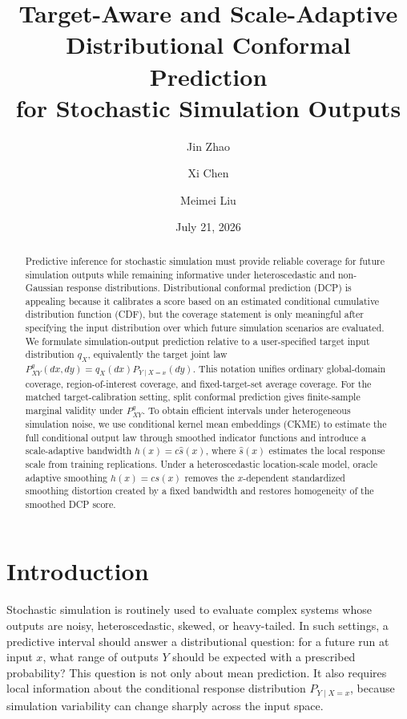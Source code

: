 \documentclass[11pt]{article}
\title{Target-Aware and Scale-Adaptive Distributional Conformal Prediction\\
for Stochastic Simulation Outputs}
\author{Jin Zhao \and Xi Chen \and Meimei Liu}
\date{July 21, 2026}
\newif\ifincludeexperiments
\begin{document}
\maketitle

\begin{abstract}
Predictive inference for stochastic simulation must provide reliable coverage for future simulation outputs while remaining informative under heteroscedastic and non-Gaussian response distributions. Distributional conformal prediction (DCP) is appealing because it calibrates a score based on an estimated conditional cumulative distribution function (CDF), but the coverage statement is only meaningful after specifying the input distribution over which future simulation scenarios are evaluated. We formulate simulation-output prediction relative to a user-specified target input distribution \(q_X\), equivalently the target joint law \(P^q_{XY}(dx,dy)=q_X(dx)P_{Y\mid X=x}(dy)\). This notation unifies ordinary global-domain coverage, region-of-interest coverage, and fixed-target-set average coverage. For the matched target-calibration setting, split conformal prediction gives finite-sample marginal validity under \(P^q_{XY}\). To obtain efficient intervals under heterogeneous simulation noise, we use conditional kernel mean embeddings (CKME) to estimate the full conditional output law through smoothed indicator functions and introduce a scale-adaptive bandwidth \(h(x)=c\widehat s(x)\), where \(\widehat s(x)\) estimates the local response scale from training replications. Under a heteroscedastic location-scale model, oracle adaptive smoothing \(h(x)=c s(x)\) removes the \(x\)-dependent standardized smoothing distortion created by a fixed bandwidth and restores homogeneity of the smoothed DCP score.
\ifincludeexperiments
Empirically, oracle adaptive smoothing improves worst-bin coverage deviation and paired interval score across Gaussian, queueing, and heavy-tailed benchmarks while preserving nominal marginal coverage.
\fi
\end{abstract}

\section{Introduction}

Stochastic simulation is routinely used to evaluate complex systems whose outputs are noisy, heteroscedastic, skewed, or heavy-tailed. In such settings, a predictive interval should answer a distributional question: for a future run at input \(x\), what range of outputs \(Y\) should be expected with a prescribed probability? This question is not only about mean prediction. It also requires local information about the conditional response distribution \(P_{Y\mid X=x}\), because simulation variability can change sharply across the input space.
\end{document}
